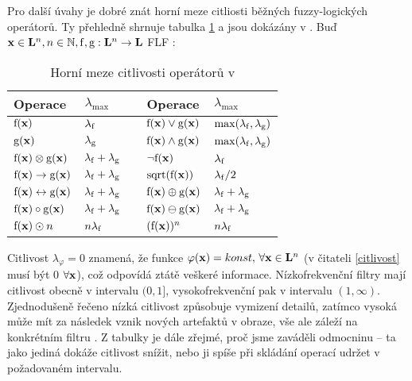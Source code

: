 Pro další úvahy je dobré znát horní meze citliosti běžných fuzzy-logických operátorů. Ty přehledně shrnuje tabulka \ref{tabulka max citlivosti} a jsou dokázány v \cite{MajerovaPhD}. Buď $\mathbf{x} \in \mathbf{L}^n ,n \in \mathbb{N} ,\mathrm{f} ,\mathrm{g} : \mathbf{L}^n \rightarrow \mathbf{L} $ FLF :

\begin{table}\label{tabulka max citlivosti}
    \begin{center}
    \begin{tabular}{llp{1cm}ll}
      \toprule
      Operace & $\lambda_{\max}$ && Operace & $\lambda_{\max}$\\
      \midrule
      $\mathrm{f}(\mathbf{x})$                         & $\lambda_{\mathrm{f}}$  && $\mathrm{f}(\mathbf{x}) \vee \mathrm{g}(\mathbf{x})$            & $\max(\lambda_{\mathrm{f}},\lambda_{\mathrm{g}})$  \\
      $\mathrm{g}(\mathbf{x})$                         & $\lambda_{\mathrm{g}}$  && $\mathrm{f}(\mathbf{x}) \wedge \mathrm{g}(\mathbf{x})$          & $\max(\lambda_{\mathrm{f}},\lambda_{\mathrm{g}})$  \\
      $\mathrm{f}(\mathbf{x}) \otimes \mathrm{g}(\mathbf{x})$         & $\lambda_{\mathrm{f}}+\lambda_{\mathrm{g}}$ && $ \neg \mathrm{f}(\mathbf{x})$         & $\lambda_{\mathrm{f}}$    \\
      $\mathrm{f}(\mathbf{x}) \rightarrow \mathrm{g}(\mathbf{x})$     & $\lambda_{\mathrm{f}}+\lambda_{\mathrm{g}}$ && $\mathrm{sqrt}(\mathrm{f}(\mathbf{x}))$         & $\lambda_{\mathrm{f}}/2$ \\
      $\mathrm{f}(\mathbf{x}) \leftrightarrow \mathrm{g}(\mathbf{x})$ & $\lambda_{\mathrm{f}}+\lambda_{\mathrm{g}}$ && $\mathrm{f}(\mathbf{x}) \oplus \mathrm{g}(\mathbf{x})$& $\lambda_{\mathrm{f}}+\lambda_{\mathrm{g}}$    \\
      $\mathrm{f}(\mathbf{x}) \circ \mathrm{g}(\mathbf{x})$           & $\lambda_{\mathrm{f}}+\lambda_{\mathrm{g}}$ &&$\mathrm{f}(\mathbf{x}) \ominus \mathrm{g}(\mathbf{x})$& $\lambda_{\mathrm{f}}+\lambda_{\mathrm{g}}$    \\
      $\mathrm{f}(\mathbf{x}) \odot n$                 & $n\lambda_{\mathrm{f}}$ &&  $(\mathrm{f}(\mathbf{x}))^n$                    & $n\lambda_{\mathrm{f}}$ \\
      \bottomrule
    \end{tabular}
    \caption{Horní meze citlivosti operátorů v \LAsq}
    \end{center}
\end{table}

Citlivost $\lambda_\varphi = 0$ znamená, že funkce $\varphi(\mathbf{x}) = konst, \, \forall \mathbf{x} \in \mathbf{L}^n$ (v čitateli \eqref{citlivost} musí být 0 $\forall \mathbf{x}$), což odpovídá ztátě veškeré informace. Nízkofrekvenční filtry mají citlivost obecně v intervalu $(0,1]$, vysokofrekvenční pak v intervalu $(1,\infty)$. Zjednodušeně řečeno nízká citlivost způsobuje vymizení detailů, zatímco vysoká může mít za následek vznik nových artefaktů v obraze, vše ale záleží na konkrétním filtru . Z tabulky je dále zřejmé, proč jsme zaváděli odmocninu -- ta jako jediná dokáže citlivost snížit, nebo ji spíše při skládání operací udržet v požadovaném intervalu. 


